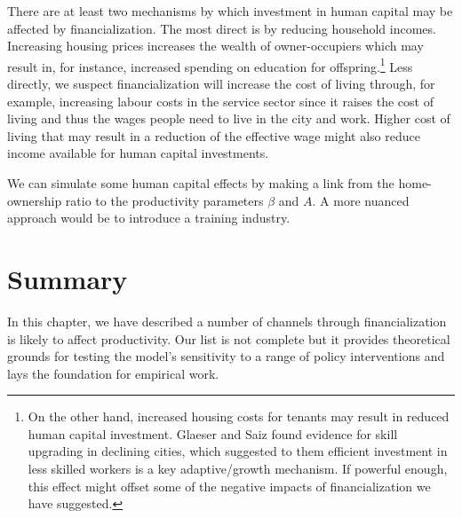 There are at least two mechanisms by which investment in human capital may be affected by financialization. The most direct is by reducing household incomes. Increasing housing prices increases the wealth of owner-occupiers which may result in, for instance, increased spending on education for offspring.\footnote{On the other hand, increased housing costs for tenants may result in reduced human capital investment. Glaeser and Saiz found evidence for skill upgrading in declining cities, which suggested to them efficient investment in less skilled workers is a key adaptive/growth mechanism. If powerful enough, this effect might offset some of the negative impacts of financialization we have suggested.} %
Less directly, we suspect financialization will increase the cost of living through, for example, increasing labour costs in the service sector since it raises the cost of living and thus the wages people need to live in the city and work. Higher cost of living that may result in a reduction of the effective wage might also reduce income available for human capital investments. %

We can simulate some human capital effects by making a link from the home-ownership ratio to the productivity parameters  $\beta$ and $A$. A more nuanced approach would be to introduce a training industry. %

\section{Summary}
In this chapter, we have described a number of channels through financialization is likely to affect productivity. %
Our list is not complete but it provides theoretical grounds for testing the model's sensitivity to a range of policy interventions and lays the foundation for empirical work.  


